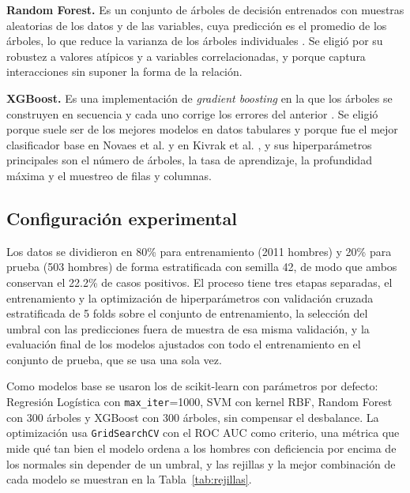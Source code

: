 \documentclass[conference]{IEEEtran}
\begin{document}
\textbf{Random Forest.} Es un conjunto de árboles de decisión entrenados con muestras aleatorias de los datos y de las variables, cuya predicción es el promedio de los árboles, lo que reduce la varianza de los árboles individuales \cite{breiman2001}. Se eligió por su robustez a valores atípicos y a variables correlacionadas, y porque captura interacciones sin suponer la forma de la relación.

\textbf{XGBoost.} Es una implementación de \emph{gradient boosting} en la que los árboles se construyen en secuencia y cada uno corrige los errores del anterior \cite{chen2016, xgboost_docs}. Se eligió porque suele ser de los mejores modelos en datos tabulares y porque fue el mejor clasificador base en Novaes et al. \cite{novaes2021} y en Kivrak et al. \cite{kivrak2024}, y sus hiperparámetros principales son el número de árboles, la tasa de aprendizaje, la profundidad máxima y el muestreo de filas y columnas.

\subsection{Configuración experimental}

Los datos se dividieron en 80\% para entrenamiento (2011 hombres) y 20\% para prueba (503 hombres) de forma estratificada con semilla 42, de modo que ambos conservan el 22.2\% de casos positivos. El proceso tiene tres etapas separadas, el entrenamiento y la optimización de hiperparámetros con validación cruzada estratificada de 5 folds sobre el conjunto de entrenamiento, la selección del umbral con las predicciones fuera de muestra de esa misma validación, y la evaluación final de los modelos ajustados con todo el entrenamiento en el conjunto de prueba, que se usa una sola vez.

Como modelos base se usaron los de scikit-learn con parámetros por defecto: Regresión Logística con \texttt{max\_iter}=1000, SVM con kernel RBF, Random Forest con 300 árboles y XGBoost con 300 árboles, sin compensar el desbalance. La optimización usa \texttt{GridSearchCV} \cite{sklearn_cv} con el ROC AUC como criterio, una métrica que mide qué tan bien el modelo ordena a los hombres con deficiencia por encima de los normales sin depender de un umbral, y las rejillas y la mejor combinación de cada modelo se muestran en la Tabla~\ref{tab:rejillas}.
\end{document}
